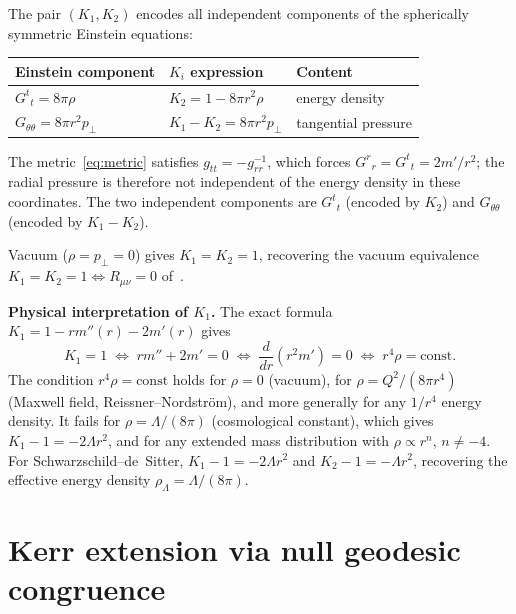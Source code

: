 \documentclass{iopart}
\begin{document}
\begin{corollary}\label{cor:complete}
The pair $(K_1,K_2)$ encodes all independent components of the
spherically symmetric Einstein equations:

\smallskip
\begin{center}
\renewcommand{\arraystretch}{1.3}
\begin{tabular}{@{}lll@{}}
\toprule
Einstein component & $K_i$ expression & Content \\
\midrule
$G^t{}_t = 8\pi\rho$ &
  $K_2 = 1 - 8\pi r^2\rho$ & energy density \\
$G_{\theta\theta} = 8\pi r^2 p_{\!\perp}$ &
  $K_1-K_2 = 8\pi r^2 p_{\!\perp}$ & tangential pressure \\
\bottomrule
\end{tabular}
\end{center}
\smallskip

\noindent
The metric~\eqref{eq:metric} satisfies $g_{tt}=-g_{rr}^{-1}$, which
forces $G^r{}_r = G^t{}_t = 2m'/r^2$; the radial pressure is
therefore not independent of the energy density in these coordinates.
The two independent components are $G^t{}_t$ (encoded by $K_2$) and
$G_{\theta\theta}$ (encoded by $K_1-K_2$).

Vacuum ($\rho=p_{\!\perp}=0$) gives $K_1=K_2=1$, recovering
the vacuum equivalence $K_1=K_2=1\Leftrightarrow R_{\mu\nu}=0$
of~\cite{K1}.
\end{corollary}

\noindent\textbf{Physical interpretation of $K_1$.}\;
The exact formula $K_1=1-rm''(r)-2m'(r)$ gives
\begin{equation}\label{eq:K1cond}
  K_1=1
  \;\Leftrightarrow\;
  rm''+2m'=0
  \;\Leftrightarrow\;
  \frac{d}{dr}(r^2 m')=0
  \;\Leftrightarrow\;
  r^4\rho = \text{const}.
\end{equation}
The condition $r^4\rho=\text{const}$ holds for $\rho=0$ (vacuum),
for $\rho=Q^2/(8\pi r^4)$ (Maxwell field, Reissner--Nordstr\"{o}m),
and more generally for any $1/r^4$ energy density.
It fails for $\rho=\Lambda/(8\pi)$ (cosmological constant), which
gives $K_1-1=-2\Lambda r^2$, and for any extended mass distribution
with $\rho\propto r^n$, $n\neq -4$.
For Schwarzschild--de~Sitter, $K_1-1=-2\Lambda r^2$ and
$K_2-1=-\Lambda r^2$, recovering the effective energy density
$\rho_\Lambda=\Lambda/(8\pi)$.

\section{Kerr extension via null geodesic congruence}\label{sec:kerr}
\end{document}
